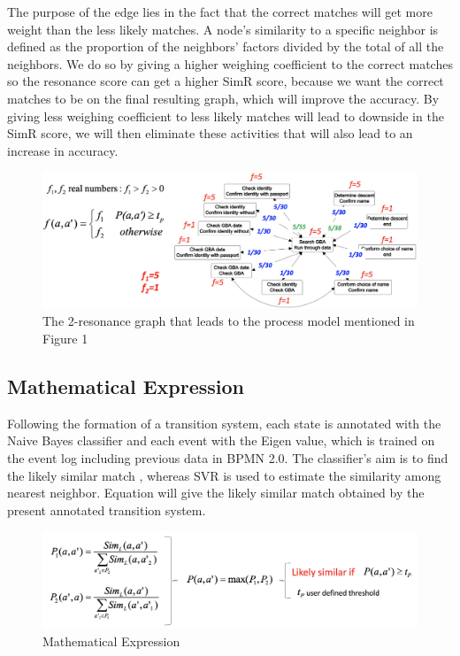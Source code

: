 \documentclass[runningheads]{llncs}
\begin{document}
The purpose of the edge lies in the fact that the correct matches will get more weight than the less likely matches. A node's similarity to a specific neighbor is defined as the proportion of the neighbors' factors divided by the total of all the neighbors. We do so by giving a higher weighing coefficient to the correct matches so the resonance score can get a higher SimR score, because we want the correct matches to be on the final resulting graph, which will improve the accuracy. By giving less weighing coefficient to less likely matches will lead to downside in the SimR score, we will then eliminate these activities that will also lead to an increase in accuracy.

\begin{figure}
    \centering
    \includegraphics[width = \textwidth]{Figures/Fig_2.PNG}
    \caption{The 2-resonance graph that leads to the process model mentioned in Figure 1}
    \label{fig:2}
\end{figure}
\subsection{Mathematical Expression}
Following the formation of a transition system, each state is annotated with the Naive Bayes classifier and each event with the Eigen value, which is trained on the event log including previous data in BPMN 2.0. The classifier's aim is to find the likely similar match , whereas SVR is used to estimate the similarity among nearest neighbor. Equation will give the likely similar match obtained by the present annotated transition system.\cite{ref18}
\begin{figure}
    \centering
    \includegraphics[width = \textwidth]{Figures/Fig_3.PNG}
    \caption{Mathematical Expression \cite{ref22}}
    \label{fig:3}
\end{figure}
\end{document}
